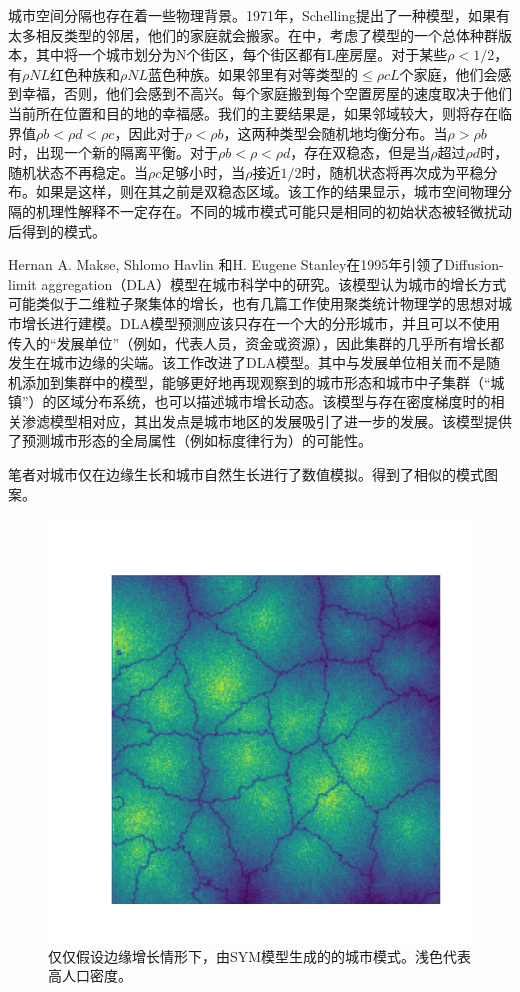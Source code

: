 城市空间分隔也存在着一些物理背景。1971年，Schelling提出了一种模型，如果有太多相反类型的邻居，他们的家庭就会搬家。在\cite{Durrett14036}中，考虑了模型的一个总体种群版本，其中将一个城市划分为N个街区，每个街区都有L座房屋。对于某些$\rho <1/2$，有$\rho NL$红色种族和$\rho NL$蓝色种族。如果邻里有对等类型的$≤\rho cL$个家庭，他们会感到幸福，否则，他们会感到不高兴。每个家庭搬到每个空置房屋的速度取决于他们当前所在位置和目的地的幸福感。我们的主要结果是，如果邻域较大，则将存在临界值$\rho b<​​\rho d<\rho c$，因此对于$\rho <\rho b$，这两种类型会随机地均衡分布。当$\rho >\rho b$时，出现一个新的隔离平衡。对于$\rho b<\rho <\rho d$，存在双稳态，但是当$\rho $超过$\rho d$时，随机状态不再稳定。当$\rho c$足够小时，当$\rho $接近$1/2$时，随机状态将再次成为平稳分布。如果是这样，则在其之前是双稳态区域。该工作的结果显示，城市空间物理分隔的机理性解释不一定存在。不同的城市模式可能只是相同的初始状态被轻微扰动后得到的模式。

Hernan A. Makse, Shlomo Havlin 和H. Eugene Stanley在1995年引领了Diffusion-limit aggregation（DLA）模型在城市科学中的研究\cite{MakseModelling}。该模型认为城市的增长方式可能类似于二维粒子聚集体的增长，也有几篇工作\cite{doi:10.1111/j.1538-4632.1991.tb00245.x, BENGUIGUI199513}使用聚类统计物理学的思想对城市增长进行建模。DLA模型预测应该只存在一个大的分形城市，并且可以不使用传入的“发展单位”（例如，代表人员，资金或资源），因此集群的几乎所有增长都发生在城市边缘的尖端。该工作改进了DLA模型。其中与发展单位相关而不是随机添加到集群中的模型，能够更好地再现观察到的城市形态和城市中子集群（“城镇”）的区域分布系统，也可以描述城市增长动态。该模型与存在密度梯度时的相关渗滤模型相对应，其出发点是城市地区的发展吸引了进一步的发展。该模型提供了预测城市形态的全局属性（例如标度律行为）的可能性。

笔者对城市仅在边缘生长和城市自然生长进行了数值模拟。得到了相似的模式图案。
\begin{figure}
  \centering
  \includegraphics[width = \linewidth]{pictures/fractal_41_256.pdf}
  \caption{仅仅假设边缘增长情形下，由SYM模型生成的的城市模式。浅色代表高人口密度。}
\end{figure}

